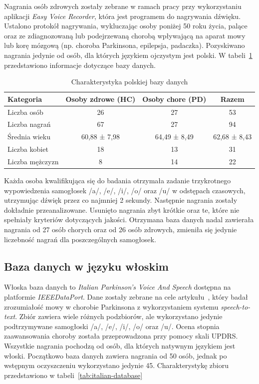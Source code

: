 Nagrania osób zdrowych zostały zebrane w ramach pracy przy wykorzystaniu aplikacji \emph{Easy Voice Recorder}, która jest programem do nagrywania dźwięku.
Ustalono protokół nagrywania, wykluczając osoby poniżej 50 roku życia, palące oraz ze zdiagnozowaną lub podejrzewaną chorobą wpływającą na aparat mowy lub korę mózgową (np. choroba Parkinsona, epilepsja, padaczka).
Pozyskiwano nagrania jedynie od osób, dla których językiem ojczystym jest polski.
W tabeli~\ref{tab:polish_database} przedstawiono informacje dotyczące bazy danych.

\begin{table}[h]
\centering
\caption{Charakterystyka polskiej bazy danych}
\label{tab:polish_database}
\begin{tabular}{|l|c|c|c|}
\hline
\textbf{Kategoria} &\textbf{Osoby zdrowe (HC)} &\textbf{Osoby chore (PD)} &\textbf{Razem} \\ \hline
Liczba osób &26 &27 &53\\ \hline
Liczba nagrań &67 &27 &94\\ \hline
Średnia wieku &60,88 ± 7,98 &64,49 ± 8,49  &62,68 ± 8,43\\ \hline
Liczba kobiet &18 &13 &31\\ \hline
Liczba mężczyzn &8 &14 &22 \\ \hline
\end{tabular}
\end{table}

Każda osoba kwalifikująca się do badania otrzymała zadanie trzykrotnego wypowiedzenia
samogłosek /a/, /e/, /i/, /o/ oraz /u/ w odstępach czasowych, utrzymując dźwięk przez co najmniej 2 sekundy.
Następnie nagrania zostały dokładnie przeanalizowane.
Usunięto nagrania zbyt krótkie oraz te, które nie spełniały kryteriów dotyczących jakości.
Otrzymana baza danych nadal zawierała nagrania od 27 osób chorych oraz od 26 osób zdrowych, zmieniła się jedynie liczebność nagrań dla poszczególnych
samogłosek.

\subsection{Baza danych w języku włoskim}
\label{subsec:wloska-baza}

Włoska baza danych to \emph{Italian Parkinson's Voice And Speech} dostępna na platformie \emph{IEEEDataPort}.
Dane zostały zebrane na cele artykułu~\cite{italian-database}, który badał zrozumiałość mowy w chorobie Parkinsona z wykorzystaniem systemu \emph{speech-to-text}.
Zbiór zawiera wiele różnych podzbiorów, ale wykorzystano jedynie podtrzymywane samogłoski /a/, /e/, /i/, /o/ oraz /u/.
Ocena stopnia zaawansowania choroby została przeprowadzona przy pomocy skali UPDRS.
Wszystkie nagrania pochodzą od osób, dla których natywnym językiem jest włoski.
Początkowo baza danych zawiera nagrania od 50 osób, jednak po wstępnym oczyszczeniu wykorzystano jedynie 45. Charakterystykę zbioru przedstawiono w tabeli~\ref{tab:italian-database}

